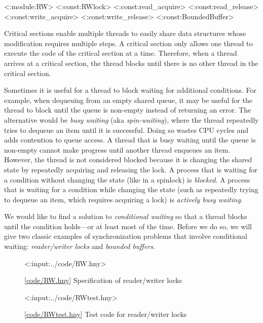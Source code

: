 \documentclass{report}
\newcommand{\harmonylink}[1]{%
[\href{https://harmony.cs.cornell.edu/#1}{\underline{#1}}]%
}
\newenvironment{code}{
\tcolorbox
}{
\endtcolorbox
}
\begin{document}
<{:module:RW}>
<{:const:RWlock}>
<{:const:read_acquire}>
<{:const:read_release}>
<{:const:write_acquire}>
<{:const:write_release}>
<{:const:BoundedBuffer}>

Critical sections enable multiple threads
to easily share data structures whose modification
requires multiple steps.
A critical section only allows one thread to execute the code
of the critical section at a time.
Therefore, when a thread arrives at a critical section,
the thread blocks until there is no other thread in the critical section.

%
%
Sometimes it is useful for a thread to block waiting for additional
conditions.
For example, when dequeuing from an empty shared queue,
it may be useful for the thread to block until the queue is non-empty
instead of returning an error.
The alternative would be \emph{busy waiting} (aka \emph{spin-waiting}),
where the thread repeatedly tries to dequeue an item until it is successful.
Doing so wastes CPU cycles and adds contention to queue access.
%
A thread that is busy waiting until the queue is non-empty cannot
make progress until another thread enqueues an item.
However, the thread is not considered blocked because it is
changing the shared state by repeatedly acquiring and releasing the
lock.
A process that is waiting for a condition without changing the state
(like in a spinlock) is \emph{blocked}.
A process that is waiting for a condition while changing the state
(such as repeatedly trying to dequeue an item, which requires
acquiring a lock) is \emph{actively busy waiting}.

We would like to find a solution to \emph{conditional waiting}
so that a thread blocks until the condition holds---or at least most
of the time.
Before we do so, we will give two classic examples of synchronization
problems that involve conditional waiting: \emph{reader/writer locks}
and \emph{bounded buffers}.

\begin{figure}
\begin{code}
<{:input:../code/RW.hny}>
\end{code}
\caption{\harmonylink{code/RW.hny} Specification of reader/writer locks}
\label{fig:rwspec}
\end{figure}

\begin{figure}
\begin{code}
<{:input:../code/RWtest.hny}>
\end{code}
\caption{\harmonylink{code/RWtest.hny} Test code for reader/writer locks}
\label{fig:rwtest}
\end{figure}
\end{document}
